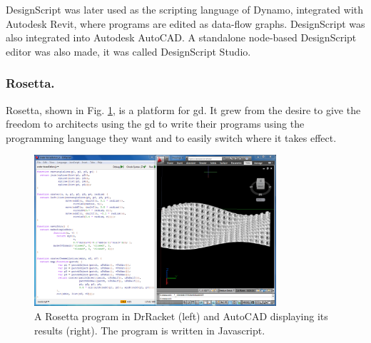 \documentclass{./llncs2e/llncs}
\begin{document}
	
	DesignScript was later used as the scripting language of Dynamo, integrated with Autodesk Revit, where programs are edited as data-flow graphs. 
	DesignScript was also integrated into Autodesk AutoCAD. 
	A standalone node-based DesignScript editor was also made, it was called DesignScript Studio.
	

\subsubsection{Rosetta.}
	Rosetta\cite{de2012modern,lopes2011portable}, shown in Fig. \ref{fig:rosetta:ex}, is a platform for \ac{gd}.
	It grew from the desire to give the freedom to architects using the \ac{gd} to write their programs using the programming language they want and to easily switch where it takes effect.
	
	\begin{figure}
		\centering
		\includegraphics[width=0.8\textwidth]{img/rosetta_js_autocad}
		\caption{A Rosetta program in DrRacket (left) and AutoCAD displaying its results (right). The program is written in Javascript.}
		\label{fig:rosetta:ex}
	\end{figure} 
	
\end{document}

